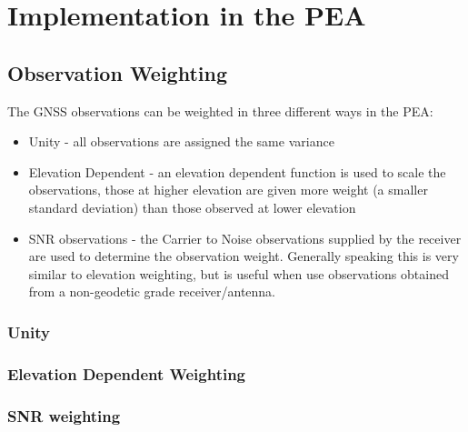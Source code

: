 \section{Implementation in the PEA}

\subsection{Observation Weighting}
%
The GNSS observations can be weighted in three different ways in the PEA:
\begin{itemize}
    \item Unity - all observations are assigned the same variance
    \item Elevation Dependent - an elevation dependent function is used to scale the observations, those at higher elevation are given more weight (a smaller standard deviation) than those observed at lower elevation
    \item SNR observations - the Carrier to Noise observations supplied by the receiver are used to determine the observation weight. Generally speaking this is very similar to elevation weighting, but is useful when use observations obtained from a non-geodetic grade receiver/antenna.
\end{itemize}
%
\subsubsection{Unity}

\subsubsection{Elevation Dependent Weighting}

\subsubsection{SNR weighting}




